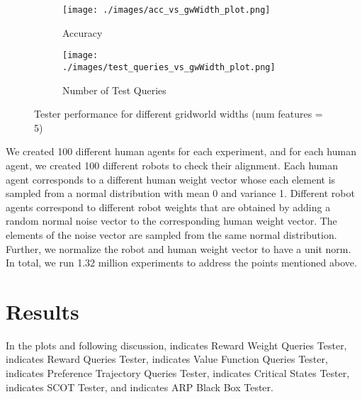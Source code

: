 \begin{figure}[!hbtp]
     \centering
     \begin{subfigure}[!ht]{0.35\textwidth}
         \centering
         \texttt{[image: ./images/acc\_vs\_gwWidth\_plot.png]}
         \caption{Accuracy}
         \label{fig:acc_vs_gwWidth_plot}
     \end{subfigure}
     \hspace{5mm}
    \begin{subfigure}[!ht]{0.35\textwidth}
         \centering
         \texttt{[image: ./images/test\_queries\_vs\_gwWidth\_plot.png]}
         \caption{Number of Test Queries}
         \label{fig:test_queries_vs_gwWidth_plot}
     \end{subfigure}
    \caption{Tester performance for different gridworld widths (num features = 5)}
    \label{fig:tester_perf_diff_gwWidth}
\end{figure}

We created 100 different human agents for each experiment, and for each human agent, we created 100 different robots to check their alignment. Each human agent corresponds to a different human weight vector whose each element is sampled from a normal distribution with mean 0 and variance 1. Different robot agents correspond to different robot weights that are obtained by adding a random normal noise vector to the corresponding human weight vector. The elements of the noise vector are sampled from the same normal distribution. Further, we normalize the robot and human weight vector to have a unit norm. In total, we run 1.32 million experiments to address the points mentioned above. 

\section{Results}
\label{sec:results}

In the plots and following discussion, {} indicates Reward Weight Queries Tester, {} indicates Reward Queries Tester, {} indicates Value Function Queries Tester, {} indicates Preference Trajectory Queries Tester, {} indicates Critical States Tester, {} indicates SCOT Tester, and {} indicates ARP Black Box Tester.

